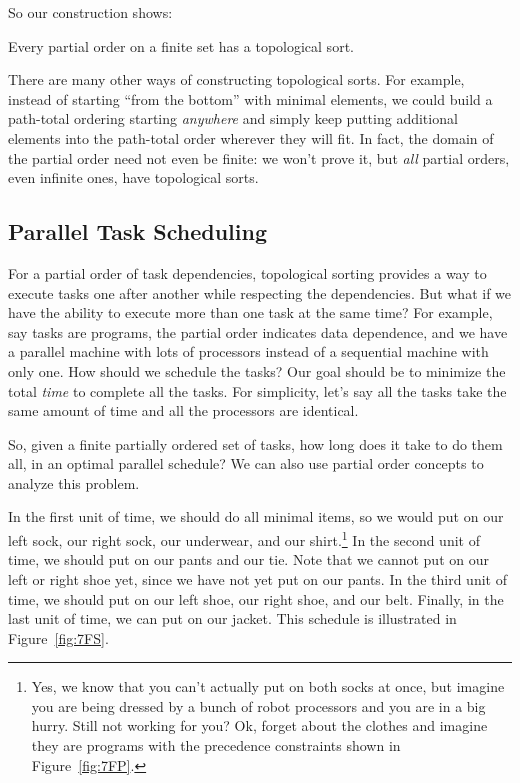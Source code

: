 So our construction shows:

\begin{theorem}\label{thm:topological}
Every partial order on a finite set has a topological sort.
\end{theorem}

There are many other ways of constructing topological sorts.  For example,
instead of starting ``from the bottom'' with minimal elements, we could
build a path-total ordering starting \emph{anywhere} and simply keep
putting additional elements into the path-total order wherever they will fit.
In fact, the domain of the partial order need not even be finite: we won't
prove it, but \emph{all} partial orders, even infinite ones, have
topological sorts.

\subsection{Parallel Task Scheduling}\label{parallel_sec}

For a partial order of task dependencies, topological sorting provides a
way to execute tasks one after another while respecting the dependencies.
But what if we have the ability to execute more than one task at the same
time?  For example, say tasks are programs, the partial order indicates
data dependence, and we have a parallel machine with lots of processors
instead of a sequential machine with only one.  How should we schedule the
tasks?  Our goal should be to minimize the total \emph{time} to complete
all the tasks.  For simplicity, let's say all the tasks take the same
amount of time and all the processors are identical.

So, given a finite partially ordered set of tasks, how long does it take
to do them all, in an optimal parallel schedule?  We can also use partial
order concepts to analyze this problem.

In the first unit of time, we should do all minimal items, so we would
put on our left sock, our right sock, our underwear, and our
shirt.\footnote{Yes, we know that you can't actually put on both socks
  at once, but imagine you are being dressed by a bunch of robot
  processors and you are in a big hurry.  Still not working for you?
  Ok, forget about the clothes and imagine they are programs with the
  precedence constraints shown in Figure~\ref{fig:7FP}.}  In the
second unit of time, we should put on our pants and our tie.  Note
that we cannot put on our left or right shoe yet, since we have not
yet put on our pants.  In the third unit of time, we should put on our
left shoe, our right shoe, and our belt.  Finally, in the last unit of
time, we can put on our jacket.  This schedule is illustrated in
Figure~\ref{fig:7FS}.

